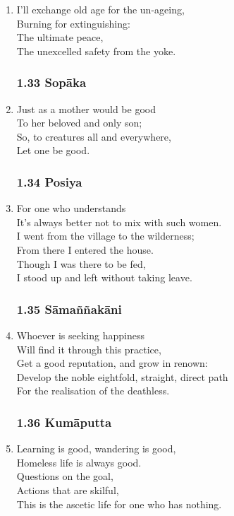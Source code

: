 \documentclass[10pt, openany]{book}
\begin{document}
\begin{enumerate}
\item I’ll exchange old age for the un-ageing,\\
Burning for extinguishing:\\
The ultimate peace,\\
The unexcelled safety from the yoke.

\subsubsection*{1.33 Sopāka}

\item Just as a mother would be good \\
To her beloved and only son;\\
So, to creatures all and everywhere,\\
Let one be good.

\subsubsection*{1.34 Posiya}

\item For one who understands\\
It’s always better not to mix with such women.\\
I went from the village to the wilderness;\\
From there I entered the house.\\
Though I was there to be fed, \\
I stood up and left without taking leave.

\subsubsection*{1.35 Sāmaññakāni}

\item Whoever is seeking happiness \\
Will find it through this practice,\\
Get a good reputation, and grow in renown:\\
Develop the noble eightfold, straight, direct path \\
For the realisation of the deathless.

\subsubsection*{1.36 Kumāputta}

\item Learning is good, wandering is good,\\
Homeless life is always good.\\
Questions on the goal,\\
Actions that are skilful,\\
This is the ascetic life for one who has nothing.


\end{enumerate}
\end{document}
